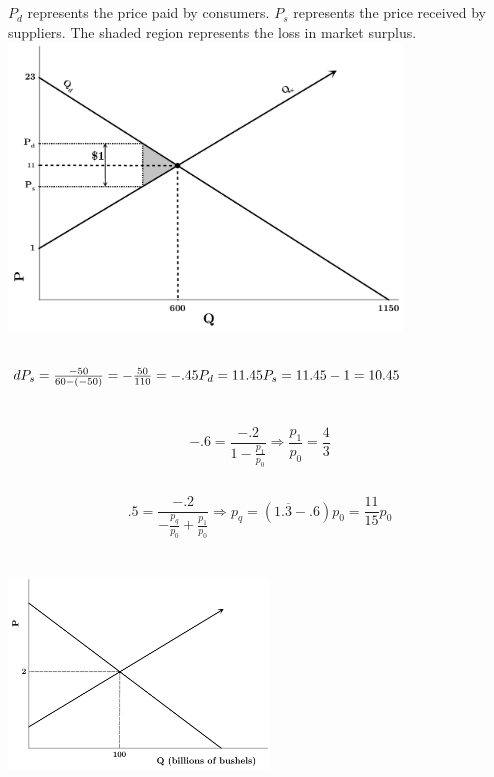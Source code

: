\documentclass{article}
\begin{document}
	\subsection[e]{}
		$P_d$ represents the price paid by consumers. $P_s$ represents the price received by suppliers. The shaded region represents the loss in market surplus. \\
		\includegraphics[height=3in]{Charts/4e}
	\subsection[f]{}
		$dP_s=\frac{-50}{60-(-50)}=-\frac{50}{110}=-.45\\
		P_d=11.45\\
		P_s=11.45-1=10.45\\$
\section[5]{}
	\subsection[a]{}
		$$ -.6 = \frac{-.2}{1-\frac{p_1}{p_0}} \Rightarrow \frac{p_1}{p_0} = \frac{4}{3} $$
	\subsection[b]{}
		$$ .5 = \frac{-.2}{-\frac{p_q}{p_0}+\frac{p_1}{p_0}} \Rightarrow p_q =  (1.\overline 3 - .6) p_0 = \frac{11}{15}p_0 $$
\section[6]{}
	\subsection[a]{}
		\includegraphics[height=2in]{Charts/6a}
\end{document}
